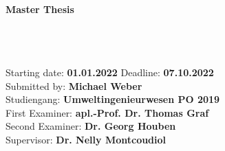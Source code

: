\begin{titlepage}
    \enlargethispage{2.0cm}
    
    
    
    \par
    \href{https://www.hydromech.uni-hannover.de/en/}{}
    \hfill
    \href{https://www.uni-hannover.de/en/}{}\\%
    \par
    
    
    \begin{center}
    \vspace{2.0cm}
    
    {\Large \textbf{Master Thesis} }\\[0.5cm]
    {\large {}} \\[0.2cm]
    {\large {}}\\[0.5cm]
    {\large {}}\\[3.2cm]
       
    
            
    \end{center}
    
    {\large Starting date: \textbf{01.01.2022} \hfill \large Deadline: \textbf{07.10.2022}} \\[0.5cm]
    {\large Submitted by: \hfill \textbf{Michael Weber}\\ Studiengang: \hfill \textbf{Umweltingenieurwesen PO 2019}}\\[0.5cm]
    {\large First Examiner: \hfill \large \textbf{apl.-Prof. Dr. Thomas Graf}}\\[0.5cm]
    {\large Second Examiner: \hfill \large \textbf{Dr. Georg Houben}}\\[0.5cm]
    {\large Supervisor: \hfill \large \textbf{Dr. Nelly Montcoudiol}\\}
    
\end{titlepage}